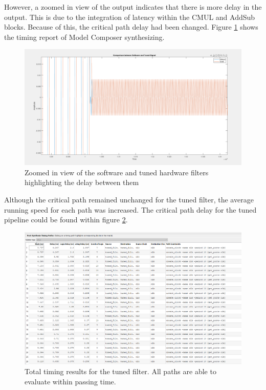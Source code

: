 \documentclass[12pt,a4paper]{article}
\begin{document}
However, a zoomed in view of the output indicates that there is more delay in the output. This is due to the integration of latency within the CMUL and AddSub blocks. Because of this, the critical path delay had been changed. Figure \ref{fig:sw_tuned_close} shows the timing report of Model Composer synthesizing.

\begin{figure}[H]
    \centering
    \includegraphics[scale=0.25]{images/sw_tuned_close.PNG}
    \caption{Zoomed in view of the software and tuned hardware filters highlighting the delay between them}
    \label{fig:sw_tuned_close}
\end{figure}

Although the critical path remained unchanged for the tuned filter, the average running speed for each path was increased. The critical path delay for the tuned pipeline could be found within figure \ref{fig:timing_results_tuned}.

\begin{figure}[H]
    \centering
    \includegraphics[scale=0.25]{images/timing_results_tuned.PNG}
    \caption{Total timing results for the tuned filter. All paths are able to evaluate within passing time.}
    \label{fig:timing_results_tuned}
\end{figure}
\end{document}
